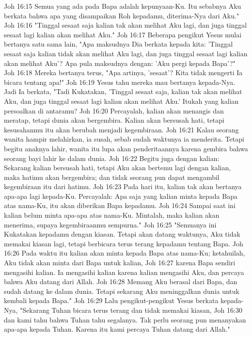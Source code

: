 Joh 16:15  Semua yang ada pada Bapa adalah kepunyaan-Ku. Itu sebabnya Aku berkata bahwa apa yang disampaikan Roh kepadamu, diterima-Nya dari Aku."
Joh 16:16  "Tinggal sesaat saja kalian tak akan melihat Aku lagi, dan juga tinggal sesaat lagi kalian akan melihat Aku."
Joh 16:17  Beberapa pengikut Yesus mulai bertanya satu sama lain, "Apa maksudnya Dia berkata kepada kita: 'Tinggal sesaat saja kalian tidak akan melihat Aku lagi, dan juga tinggal sesaat lagi kalian akan melihat Aku'? Apa pula maksudnya dengan: 'Aku pergi kepada Bapa'?"
Joh 16:18  Mereka bertanya terus, "Apa artinya, 'sesaat'? Kita tidak mengerti Ia bicara tentang apa!"
Joh 16:19  Yesus tahu mereka mau bertanya kepada-Nya. Jadi Ia berkata, "Tadi Kukatakan, 'Tinggal sesaat saja, kalian tak akan melihat Aku, dan juga tinggal sesaat lagi kalian akan melihat Aku.' Itukah yang kalian persoalkan di antaramu?
Joh 16:20  Percayalah, kalian akan menangis dan meratap, tetapi dunia akan bergembira. Kalian akan bersusah hati, tetapi kesusahanmu itu akan berubah menjadi kegembiraan.
Joh 16:21  Kalau seorang wanita hampir melahirkan, ia susah, sebab sudah waktunya ia menderita. Tetapi begitu anaknya lahir, wanita itu lupa akan penderitaannya karena gembira bahwa seorang bayi lahir ke dalam dunia.
Joh 16:22  Begitu juga dengan kalian: Sekarang kalian bersusah hati, tetapi Aku akan bertemu lagi dengan kalian, maka hatimu akan bergembira; dan tidak seorang pun dapat mengambil kegembiraan itu dari hatimu.
Joh 16:23  Pada hari itu, kalian tak akan bertanya apa-apa lagi kepada-Ku. Percayalah: Apa saja yang kalian minta kepada Bapa atas nama-Ku, itu akan diberikan Bapa kepadamu.
Joh 16:24  Sampai saat ini kalian belum minta apa-apa atas nama-Ku. Mintalah, maka kalian akan menerima, supaya kegembiraanmu sempurna."
Joh 16:25  "Semuanya ini Kukatakan kepadamu dengan kiasan. Tetapi akan datang waktunya, Aku tidak memakai kiasan lagi, tetapi berbicara terus terang kepadamu tentang Bapa.
Joh 16:26  Pada waktu itu kalian akan minta kepada Bapa atas nama-Ku; ketahuilah, Aku tidak akan minta dari Bapa untuk kalian,
Joh 16:27  karena Bapa sendiri mengasihi kalian. Ia mengasihi kalian karena kalian mengasihi Aku, dan percaya bahwa Aku datang dari Allah.
Joh 16:28  Memang Aku berasal dari Bapa, dan sudah datang ke dalam dunia. Tetapi sekarang Aku meninggalkan dunia untuk kembali kepada Bapa."
Joh 16:29  Lalu pengikut-pengikut Yesus berkata kepada-Nya, "Sekarang Tuhan bicara terus terang dan tidak memakai kiasan,
Joh 16:30  dan kami tahu bahwa Tuhan tahu segalanya. Tak perlu seorang pun menanyakan apa-apa kepada Tuhan. Karena itu kami percaya Tuhan datang dari Allah."
